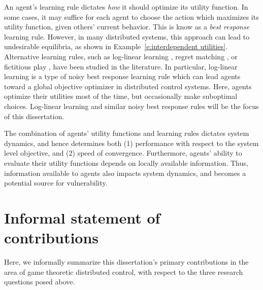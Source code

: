 An agent's learning rule dictates {\it how} it should optimize its utility function. In some cases, it may suffice for each agent to choose the action which maximizes its utility function, given others' current behavior. This is know as a {\it best response} learning rule. However, in many distributed systems, this approach can lead to undesirable equilibria, as shown in Example~\ref{e:interdependent utilities}. Alternative learning rules, such as log-linear learning \cite{Blume1993}, regret matching \cite{Foster2006, Marden2007}, or fictitious play \cite{fp1,fp2}, have been studied in the literature. In particular, log-linear learning is a type of noisy best response learning rule which can lead agents toward a global objective optimizer in distributed control systems. Here, agents optimize their utilities most of the time, but occasionally make suboptimal choices. Log-linear learning and similar noisy best response rules will be the focus of this dissertation.

The combination of agents' utility functions and learning rules dictates system dynamics, and hence determines both (1) performance with respect to the system level objective, and (2) speed of convergence. Furthermore, agents' ability to evaluate their utility functions depends on locally available information. Thus, information available to agents also impacts system dynamics, and becomes a potential source for vulnerability.



\section{Informal statement of contributions}


Here, we informally summarize this dissertation's primary contributions in the area of game theoretic distributed control, with respect to the three research questions posed above.


\smallskip

